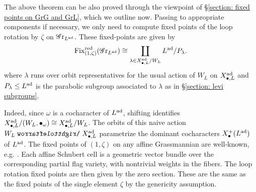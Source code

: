 \begin{remark}
The above theorem can be also proved through the viewpoint of \S \ref{section: fixed points on GrG and GrL}, which we outline now. Passing to appropriate components if necessary, we only need to compute fixed points of the loop rotation by $\zeta$ on $\operatorname{\mathscr{G}r}_{L^{\operatorname{ad}}}$. These fixed-points are given by
\begin{equation}
    \operatorname{Fix}^{\operatorname{red}}_{(1, \zeta)}(\operatorname{\mathscr{G}r}_{L^{\operatorname{ad}}}) \cong \coprod_{\lambda \in X^{\operatorname{ad}}_{\bullet, L}/W_L} L^{\operatorname{ad}}/P_{\lambda}.
\end{equation}
where $\lambda$ runs over orbit representatives for the usual action of $W_L$ on $X^{\operatorname{ad}}_{\bullet, L}$ and $P_{\lambda} \leq L^{\operatorname{ad}}$ is the parabolic subgroup associated to $\lambda$ as in \S \ref{section: levi subgroups}.

Indeed, since $\omega$ is a cocharacter of $L^{\operatorname{ad}}$, shifting identifies $X^{\operatorname{ad}}_{\bullet, L}/(W_L, \bullet_{\omega}) \cong X^{\operatorname{ad}}_{\bullet, L}/W_L$. The orbits of this naive action $W_L \acts X^{\ad}_{\bullet, L}$ parametrize the dominant cocharacters $X^+_{\bullet}(L^{\operatorname{ad}})$ of $L^{\operatorname{ad}}$. 
The fixed points of $(1, \zeta)$ on any affine Grassmannian are well-known, e.g. \cite[above Example 2.1.12]{Zhu15}. Each affine Schubert cell is a geometric vector bundle over the corresponding partial flag variety, with nontrivial weights in the fibers. The loop rotation fixed points are then given by the zero section. These are the same as the fixed points of the single element $\zeta$ by the genericity assumption.
\end{remark}



